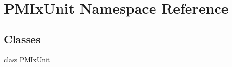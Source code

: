 \hypertarget{namespace_p_m_ix_unit}{\section{P\-M\-Ix\-Unit Namespace Reference}
\label{namespace_p_m_ix_unit}
}
\subsection*{Classes}
\begin{DoxyCompactItemize}
\item 
class \hyperlink{class_p_m_ix_unit_1_1_p_m_ix_unit}{P\-M\-Ix\-Unit}
\end{DoxyCompactItemize}
